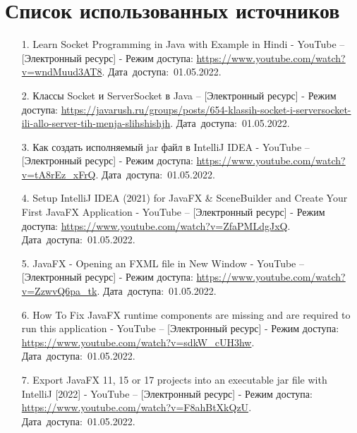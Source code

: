 \documentclass[12pt, a4paper, simple]{eskdtext}
\begin{document}
    \section*{Список использованных источников}
    \begin{enumerate}
        \item[1.] Learn Socket Programming in Java with Example in Hindi - YouTube -- [Электронный ресурс]
        - Режим доступа: \url{https://www.youtube.com/watch?v=wndMuud3AT8}.
        Дата~доступа:~01.05.2022.
        \item[2.] Классы Socket и ServerSocket в Java -- [Электронный ресурс]
        - Режим доступа: \url{https://javarush.ru/groups/posts/654-klassih-socket-i-serversocket-ili-allo-server-tih-menja-slihshishjh}.
        Дата~доступа:~01.05.2022.
        \item[3.] Как создать исполняемый jar файл в IntelliJ IDEA - YouTube -- [Электронный ресурс]
        - Режим доступа: \url{https://www.youtube.com/watch?v=tA8rEz_xFrQ}.
        Дата~доступа:~01.05.2022.
        \item[4.] Setup IntelliJ IDEA (2021) for JavaFX \& SceneBuilder and Create Your First JavaFX Application - YouTube -- [Электронный ресурс]
        - Режим доступа: \url{https://www.youtube.com/watch?v=ZfaPMLdgJxQ}.
        Дата~доступа:~01.05.2022.
        \item[5.] JavaFX - Opening an FXML file in New Window - YouTube -- [Электронный ресурс]
        - Режим доступа: \url{https://www.youtube.com/watch?v=ZzwvQ6pa_tk}.
        Дата~доступа:~01.05.2022.
        \item[6.] How To Fix JavaFX runtime components are missing and are required to run this application - YouTube -- [Электронный ресурс]
        - Режим доступа: \url{https://www.youtube.com/watch?v=sdkW_cUH3hw}.
        Дата~доступа:~01.05.2022.
        \item[7.] Export JavaFX 11, 15 or 17 projects into an executable jar file with IntelliJ [2022] - YouTube -- [Электронный ресурс]
        - Режим доступа: \url{https://www.youtube.com/watch?v=F8ahBtXkQzU}.
        Дата~доступа:~01.05.2022.
    \end{enumerate}
    \newpage
\end{document}
